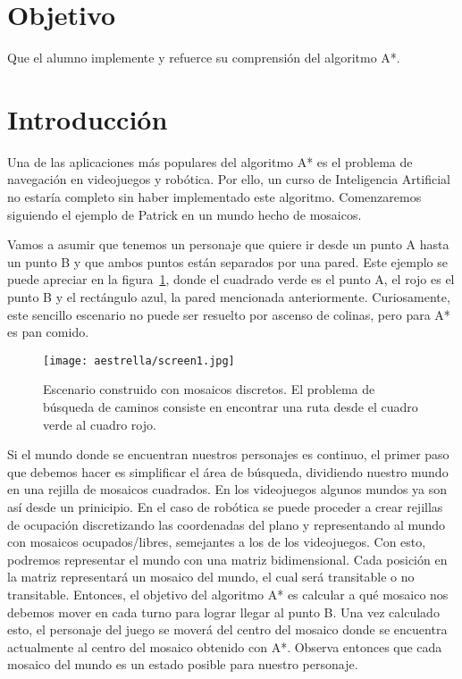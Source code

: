 
\section{Objetivo}

Que el alumno implemente y refuerce su comprensión del algoritmo A*.

\section{Introducci\'on}

Una de las aplicaciones más populares del algoritmo A* es el problema de navegación en videojuegos y robótica.  Por ello, un curso de Inteligencia Artificial no estaría completo sin haber implementado este algoritmo.  Comenzaremos siguiendo el ejemplo de Patrick \cite{Lester2003} en un mundo hecho de mosaicos.

Vamos a asumir que tenemos un personaje que quiere ir desde un punto A hasta un punto B y que ambos puntos están separados por una pared. Este ejemplo se puede apreciar en la figura~\ref{fig:fig1P4}, donde el cuadrado verde es el punto A, el rojo es el punto B y el rectángulo azul, la pared mencionada anteriormente.  Curiosamente, este sencillo escenario no puede ser resuelto por ascenso de colinas, pero para A* es pan comido.

\begin{figure}
  \centering
  \texttt{[image: aestrella/screen1.jpg]}
  \caption{Escenario construido con mosaicos discretos. El problema de búsqueda de caminos consiste en encontrar una ruta desde el cuadro verde al cuadro rojo.}
  \label{fig:fig1P4}
\end{figure}

Si el mundo donde se encuentran nuestros personajes es continuo, el primer paso que debemos hacer es simplificar el área de búsqueda, dividiendo nuestro mundo en una rejilla de mosaicos cuadrados.  En los videojuegos algunos mundos ya son así desde un prinicipio.  En el caso de robótica se puede proceder a crear rejillas de ocupación discretizando las coordenadas del plano y representando al mundo con mosaicos ocupados/libres, semejantes a los de los videojuegos.  Con esto, podremos representar el mundo con una matriz bidimensional. Cada posición en la matriz representará un mosaico del mundo, el cual será transitable o no transitable. Entonces, el objetivo del algoritmo A* es calcular a qué mosaico nos debemos mover en cada turno para lograr llegar al punto B. Una vez calculado esto, el personaje del juego se moverá del centro del mosaico donde se encuentra actualmente al centro del mosaico obtenido con A*.  Observa entonces que cada mosaico del mundo es un estado posible para nuestro personaje.

